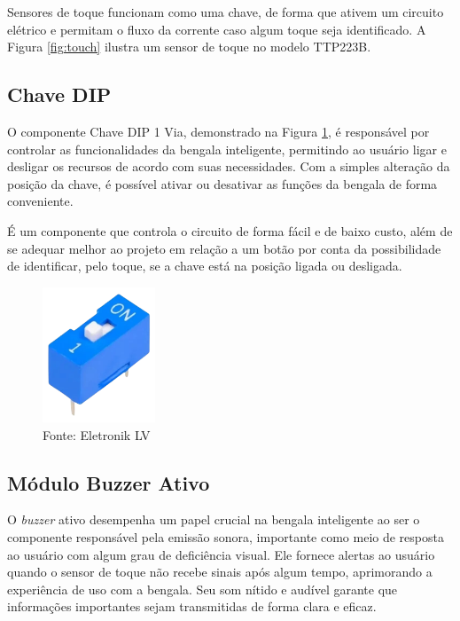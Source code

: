     Sensores de toque funcionam como uma chave, de forma que ativem um circuito elétrico e permitam o fluxo da corrente caso algum toque seja identificado. A Figura \ref{fig:touch} ilustra um sensor de toque no modelo TTP223B.
    
    
    \subsection{Chave DIP }
    O componente Chave DIP  1 Via, demonstrado na Figura \ref{fig:chave}, é responsável por controlar as funcionalidades da bengala inteligente, permitindo ao usuário ligar e desligar os recursos de acordo com suas necessidades. Com a simples alteração da posição da chave, é possível ativar ou desativar as funções da bengala de forma conveniente.

    É um componente que controla o circuito de forma fácil e de baixo custo, além de se adequar melhor ao projeto em relação a um botão por conta da possibilidade de identificar, pelo toque, se a chave está na posição ligada ou desligada.

    \begin{figure}[h!]
        \captionsetup{width=1\textwidth}
        \caption{\label{fig:chave}Chave DIP  1 Via}
        \centering
        \includegraphics[width=0.3\textwidth]{figuras/chave} 
        \caption*{Fonte: Eletronik LV}
    \end{figure}

    \subsection{Módulo Buzzer Ativo}
    O \textit{buzzer} ativo desempenha um papel crucial na bengala inteligente ao ser o componente responsável pela emissão sonora, importante como meio de resposta ao usuário com algum grau de deficiência visual. Ele fornece alertas ao usuário quando o sensor de toque não recebe sinais após algum tempo, aprimorando a experiência de uso com a bengala. Seu som nítido e audível garante que informações importantes sejam transmitidas de forma clara e eficaz.


